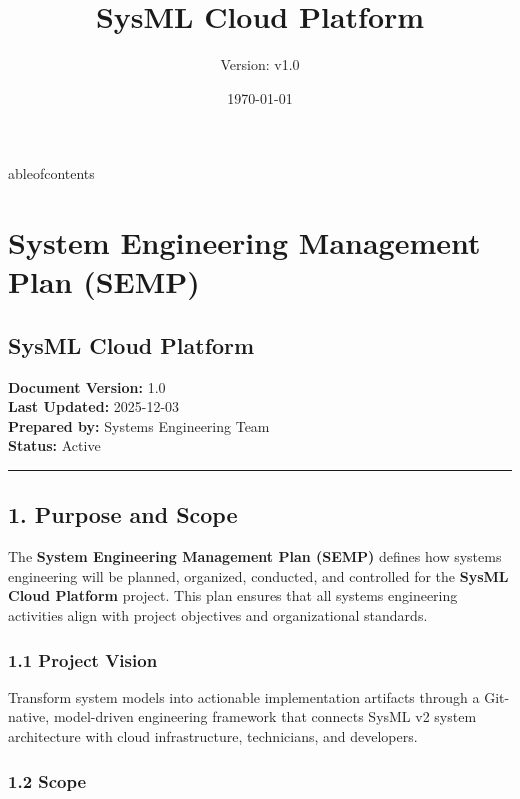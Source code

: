 \documentclass[12pt]{article}
\title{SysML Cloud Platform}
\author{Version: v1.0}
\date{\today}
\begin{document}
\maketitle
\thispagestyle{empty}
\clearpage

	ableofcontents
\clearpage

\section{System Engineering Management Plan
(SEMP)}\label{system-engineering-management-plan-semp}

\subsection{SysML Cloud Platform}\label{sysml-cloud-platform}

\textbf{Document Version:} 1.0\\
\textbf{Last Updated:} 2025-12-03\\
\textbf{Prepared by:} Systems Engineering Team\\
\textbf{Status:} Active

\begin{center}\rule{0.5\linewidth}{0.5pt}\end{center}

\subsection{1. Purpose and Scope}\label{purpose-and-scope}

The \textbf{System Engineering Management Plan (SEMP)} defines how
systems engineering will be planned, organized, conducted, and
controlled for the \textbf{SysML Cloud Platform} project. This plan
ensures that all systems engineering activities align with project
objectives and organizational standards.

\subsubsection{1.1 Project Vision}\label{project-vision}

Transform system models into actionable implementation artifacts through
a Git-native, model-driven engineering framework that connects SysML v2
system architecture with cloud infrastructure, technicians, and
developers.

\subsubsection{1.2 Scope}\label{scope}
\end{document}
